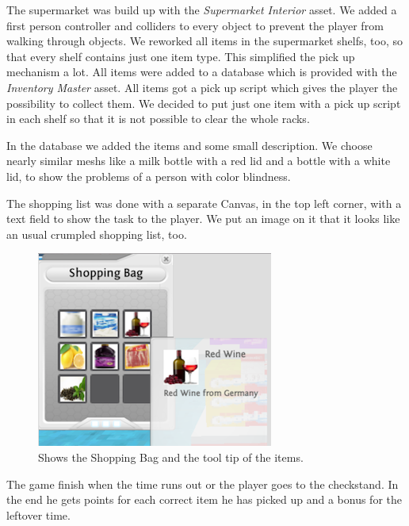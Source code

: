 \documentclass{sig-alternate-05-2015}
\begin{document}
The supermarket was build up with the \emph{Supermarket Interior} asset.
We added a first person controller and colliders to every object to prevent the player from walking through objects.
We reworked all items in the supermarket shelfs, too, so that every shelf contains just one item type.
This simplified the pick up mechanism a lot.
All items were added to a database which is provided with the \emph{Inventory Master} asset.
All items got a pick up script which gives the player the possibility to collect them.
We decided to put just one item with a pick up script in each shelf so that it is not possible to clear the whole racks.

In the database we added the items and some small description.
We choose nearly similar meshs like a milk bottle with a red lid and a bottle with a white lid, to show the problems of a person with color blindness.

The shopping list was done with a separate Canvas, in the top left corner, with a text field to show the task to the player.
We put an image on it that it looks like an usual crumpled shopping list, too.
%
\begin{figure}
    \centering
    \includegraphics[width=\columnwidth]{ShoppingBag.png}
    \caption{Shows the Shopping Bag and the tool tip of the items.}
    \label{fig:ShoppingBag}
\end{figure}
%
The game finish when the time runs out or the player goes to the checkstand.
In the end he gets points for each correct item he has picked up and a bonus for the leftover time.
\end{document}
